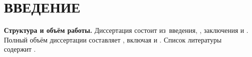 \chapter*{ВВЕДЕНИЕ}

\newcommand{\actuality}{\textbf{Актуальность темы.}\enspace\ignorespaces}
\newcommand{\aim}{\textbf{Цель работы.}\enspace\ignorespaces}
\newcommand{\tasks}{\textbf{Задачи работы.}\enspace\ignorespaces}
\newcommand{\novelty}{\textbf{Научная новизна.}\enspace\ignorespaces}
\newcommand{\influence}{\textbf{Теоретическая и практическая значимость.}\enspace\ignorespaces}
\newcommand{\methods}{\textbf{Методы и инструменты исследования.}\enspace\ignorespaces}
\newcommand{\defpositions}{\textbf{Основные положения, выносимые на защиту.}\enspace\ignorespaces}
\newcommand{\relevance}{\textbf{Соответствие специальности.}\enspace\ignorespaces}
\newcommand{\reliability}{\textbf{Достоверность результатов проведённых исследований.}\enspace\ignorespaces}
\newcommand{\probation}{\textbf{Апробация работы.}\enspace\ignorespaces}
\newcommand{\contribution}{\textbf{Личный вклад автора.}\enspace\ignorespaces}
\newcommand{\publications}{\textbf{Публикации по теме диссертации.}\enspace\ignorespaces}
\newcommand{\structure}{\textbf{Структура и объём работы.}\enspace\ignorespaces}



\structure
Диссертация состоит из~введения,
,
заключения и
.
Полный объём диссертации составляет
, включая
 и
.
Список литературы содержит
.
